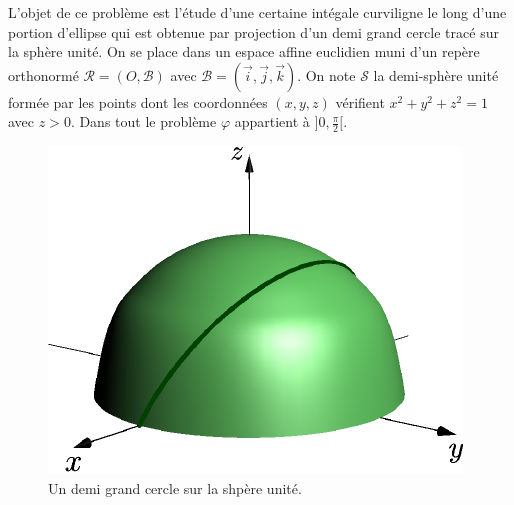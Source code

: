 L'objet de ce problème est l'étude d'une certaine intégale curviligne le long d'une portion d'ellipse qui est obtenue par projection d'un demi grand cercle tracé sur la sphère unité.\newline
On se place dans un espace affine euclidien muni d'un repère orthonormé $\mathcal{R}=(O,\mathcal{B})$ avec $\mathcal{B}=(\overrightarrow{i},\overrightarrow{j},\overrightarrow{k})$. On note $\mathcal{S}$ la demi-sphère unité formée par les points dont les coordonnées $(x,y,z)$ vérifient $x^2+y^2+z^2=1$ avec $z > 0$.\newline
Dans tout le problème $\varphi$ appartient à $]0,\frac{\pi}{2}[$.
\begin{figure}[h!t]
 \centering
 \includegraphics{./Eintcurv_1.pdf}
 \caption{Un demi grand cercle sur la shpère unité.}
 \label{fig:Eintcurv_1}
\end{figure}
